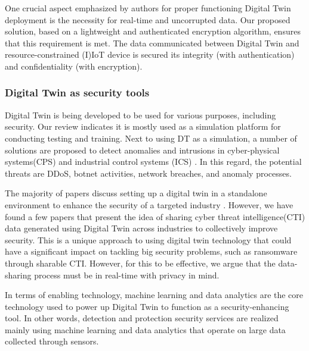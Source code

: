 One crucial aspect emphasized by authors for proper functioning Digital Twin deployment is the necessity for real-time and uncorrupted data. Our proposed solution, based on a lightweight and authenticated encryption algorithm, ensures that this requirement is met. The data communicated between Digital Twin and resource-constrained (I)IoT device is secured its integrity (with authentication) and confidentiality (with encryption). 



\subsubsection*{Digital Twin as security tools}
Digital Twin is being developed to be used for various purposes, including security. Our review indicates it is mostly used as a simulation platform for conducting testing and training. Next to using DT as a simulation, a number of solutions are proposed to detect anomalies \cite{chukkapalliCyberPhysicalSystemSecurity2021} and intrusions in cyber-physical systems(CPS) and industrial control systems (ICS) \cite{vargheseDigitalTwinbasedIntrusion2022, akbarianIntrusionDetectionDigital2020}. In this regard, the potential threats are DDoS, botnet activities, network breaches, and anomaly processes.   


The majority of papers discuss setting up a digital twin in a standalone environment to enhance the security of a targeted industry \cite{almeaibedDigitalTwinAnalysis2021, veledarDigitalTwinsDependability2019, chukkapalliCyberPhysicalSystemSecurity2021, adrienbacueDigitalTwinsEnhanced2022}. However, we have found a few papers that present the idea of sharing cyber threat intelligence(CTI) \cite{dietzHarnessingDigitalTwin2022, almeaibedDigitalTwinAnalysis2021} data generated using Digital Twin across industries to collectively improve security. This is a unique approach to using digital twin technology that could have a significant impact on tackling big security problems, such as ransomware through sharable CTI. However, for this to be effective, we argue that the data-sharing process must be in real-time with privacy in mind. 


In terms of enabling technology, machine learning and data analytics are the core technology used to power up Digital Twin to function as a security-enhancing tool. In other words, detection and protection security services are realized mainly using machine learning and data analytics that operate on large data collected through sensors. 


